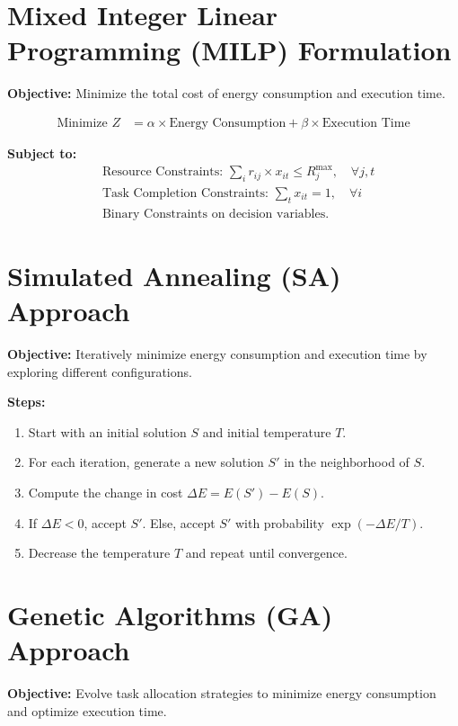 \documentclass{article}
\begin{document}
\section*{Mixed Integer Linear Programming (MILP) Formulation}
\textbf{Objective:} Minimize the total cost of energy consumption and execution time.

\begin{align*}
    \text{Minimize } Z &= \alpha \times \text{Energy Consumption} + \beta \times \text{Execution Time}
\end{align*}

\textbf{Subject to:}
\begin{align*}
    &\text{Resource Constraints: } \sum_{i} r_{ij} \times x_{it} \leq R_{j}^{\text{max}}, \quad \forall j, t \\
    &\text{Task Completion Constraints: } \sum_{t} x_{it} = 1, \quad \forall i \\
    &\text{Binary Constraints on decision variables.}
\end{align*}

\section*{Simulated Annealing (SA) Approach}
\textbf{Objective:} Iteratively minimize energy consumption and execution time by exploring different configurations.

\textbf{Steps:}
\begin{enumerate}
    \item Start with an initial solution \(S\) and initial temperature \(T\).
    \item For each iteration, generate a new solution \(S'\) in the neighborhood of \(S\).
    \item Compute the change in cost \(\Delta E = E(S') - E(S)\).
    \item If \(\Delta E < 0\), accept \(S'\). Else, accept \(S'\) with probability \(\exp(-\Delta E / T)\).
    \item Decrease the temperature \(T\) and repeat until convergence.
\end{enumerate}

\section*{Genetic Algorithms (GA) Approach}
\textbf{Objective:} Evolve task allocation strategies to minimize energy consumption and optimize execution time.
\end{document}
